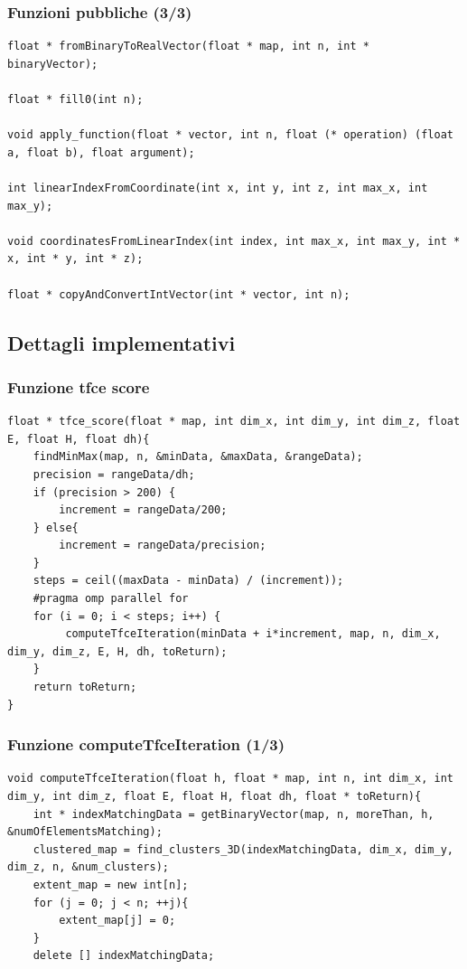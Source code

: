 \documentclass{beamer}
\begin{document}
\begin{frame}[fragile]
\frametitle{Funzioni pubbliche (3/3)}
\begin{center}
\begin{lstlisting}
float * fromBinaryToRealVector(float * map, int n, int * binaryVector);

float * fill0(int n);

void apply_function(float * vector, int n, float (* operation) (float a, float b), float argument);

int linearIndexFromCoordinate(int x, int y, int z, int max_x, int max_y);

void coordinatesFromLinearIndex(int index, int max_x, int max_y, int * x, int * y, int * z);

float * copyAndConvertIntVector(int * vector, int n);
\end{lstlisting}
\end{center}
\end{frame}

\subsection{Dettagli implementativi}
\begin{frame}[fragile]
\frametitle{Funzione tfce score}
\begin{center}
\begin{lstlisting}
float * tfce_score(float * map, int dim_x, int dim_y, int dim_z, float E, float H, float dh){
	findMinMax(map, n, &minData, &maxData, &rangeData);
	precision = rangeData/dh;
	if (precision > 200) {
		increment = rangeData/200;
	} else{
		increment = rangeData/precision;	
	}
	steps = ceil((maxData - minData) / (increment));
	#pragma omp parallel for
	for (i = 0; i < steps; i++) {
		 computeTfceIteration(minData + i*increment, map, n, dim_x, dim_y, dim_z, E, H, dh, toReturn);
	}	
	return toReturn;
}
\end{lstlisting}
\end{center}
\end{frame}

\begin{frame}[fragile]
\frametitle{Funzione computeTfceIteration (1/3)}
\begin{center}
\begin{lstlisting}
void computeTfceIteration(float h, float * map, int n, int dim_x, int dim_y, int dim_z, float E, float H, float dh, float * toReturn){
	int * indexMatchingData = getBinaryVector(map, n, moreThan, h, &numOfElementsMatching);
	clustered_map = find_clusters_3D(indexMatchingData, dim_x, dim_y, dim_z, n, &num_clusters);
	extent_map = new int[n];
	for (j = 0; j < n; ++j){
		extent_map[j] = 0;
	}
	delete [] indexMatchingData;
\end{lstlisting}
\end{center}
\end{frame}
\end{document}
